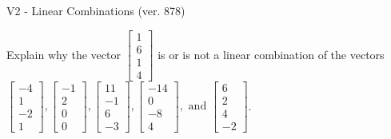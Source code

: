 \begin{exercise}
  \begin{exerciseTitle}V2 - Linear Combinations (ver. 878)\end{exerciseTitle}
  \begin{exerciseStatement}
    Explain why the vector \(\left[\begin{array}{c}
1 \\
6 \\
1 \\
4
\end{array}\right]\)  is or is not a linear 
	combination of the vectors \(\left[\begin{array}{c}
-4 \\
1 \\
-2 \\
1
\end{array}\right] , \left[\begin{array}{c}
-1 \\
2 \\
0 \\
0
\end{array}\right] , \left[\begin{array}{c}
11 \\
-1 \\
6 \\
-3
\end{array}\right] , \left[\begin{array}{c}
-14 \\
0 \\
-8 \\
4
\end{array}\right] , \text{ and } \left[\begin{array}{c}
6 \\
2 \\
4 \\
-2
\end{array}\right]\).
	



\end{exerciseStatement}
\end{exercise}
